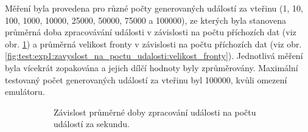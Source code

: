 Měření byla provedena pro různé počty generovaných událostí za vteřinu (1, 10, 100, 1000, 10000, 25000, 50000, 75000 a 100000), ze kterých byla stanovena průměrná doba zpracovávání události v závislosti na počtu příchozích dat (viz obr. \ref{fig:test:exp1:zavyslost_na_poctu_udalosti:doba_zpracovani}) a průměrná velikost fronty v závislosti na počtu příchozích dat (viz obr. \ref{fig:test:exp1:zavyslost_na_poctu_udalosti:velikost_fronty}). Jednotlivá měření byla vícekrát zopakována a jejich dílčí hodnoty byly zprůměrovány. Maximální testovaný počet generovaných událostí za vteřinu byl 100000, kvůli omezení emulátoru.

\begin{figure}[h]
    \centering
    \begin{subfigure}[t!]{0.47\textwidth}
        \caption{Závislost průměrné doby zpracování události na počtu událostí za sekundu.}
        \label{fig:test:exp1:zavyslost_na_poctu_udalosti:doba_zpracovani}
    \end{subfigure}
    \hspace{0.2cm}
    \begin{subfigure}[t!]{0.47\textwidth}
    

\end{subfigure}
\end{figure}
